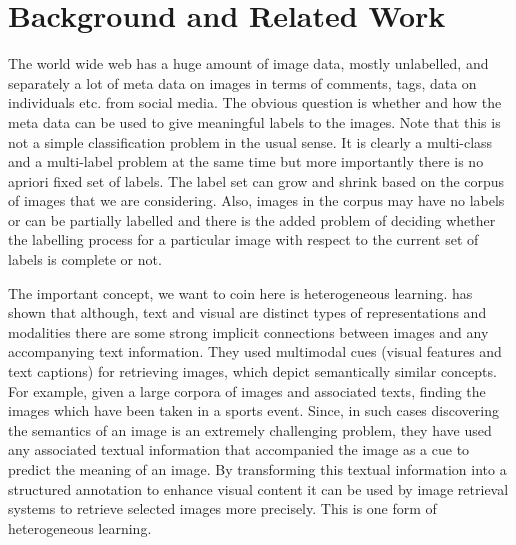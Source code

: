 
\chapter{Background and Related Work} %

\label{relatedWork} %


The world wide web has a huge amount of image data, mostly unlabelled, and separately a lot of meta data on images in terms of comments, tags,  data on individuals etc. from social media. The obvious question is whether and how the meta data can be used to give meaningful labels to the images. Note that this is not a simple classification problem in the usual sense. It is clearly a multi-class and a multi-label problem at the same time but more importantly there is no apriori fixed set of labels. The label set can grow and shrink based on the corpus of images that we are considering. Also, images in the corpus may have no labels or can be partially labelled and there is the added problem of deciding whether the labelling process for a particular image with respect to the current set of labels is complete or not.

The important concept, we want to coin here is heterogeneous learning.
\citet*{kesorn} has shown that although, text and visual are
distinct types of representations and modalities there are some
strong implicit connections between images and any accompanying text
information. They used multimodal cues (visual features and text
captions) for retrieving images, which depict semantically similar
concepts. For example, given a large corpora of images and
associated texts, finding the images which have been taken in a
sports event.  Since, in such cases discovering the semantics of an
image is an extremely challenging problem, they have used any
associated textual information that accompanied the image as a cue
to predict the meaning of an image. By transforming this textual
information into a structured annotation to enhance visual content
it can be used by image retrieval systems to retrieve selected
images more precisely. This is one form of heterogeneous learning.


